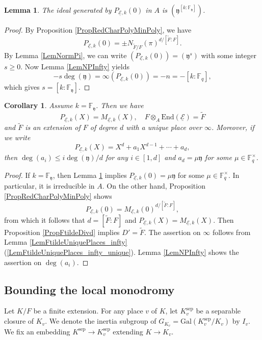 \documentclass[10pt]{amsart}
\theoremstyle{plain}
\newtheorem{lem}[thm]{Lemma}
\newtheorem{cor}[thm]{Corollary}
\theoremstyle{definition}
\newcommand{\End}{\mathrm{End}}
\newcommand{\Gal}{\mathrm{Gal}}
\newcommand{\sep}{\mathrm{sep}}
\newcommand{\ucE}{\underline{\mathcal{E}}}
\newcommand{\bF}{\mathbb{F}}
\newcommand{\fry}{\mathfrak{y}}
\begin{document}
\begin{lem}\label{LemConstTermRedCharPoly}
	The ideal generated by $P_{\ucE,k}(0)$ in $A$ is $(\fry^{[k:\bF_\fry]})$.
\end{lem}
\begin{proof}
	By Proposition \ref{PropRedCharPolyMinPoly}, we have
	\[
	P_{\ucE,k}(0)=\pm N_{\tilde{F}/F}(\pi)^{d/[\tilde{F}:F]}.
	\]
	By Lemma \ref{LemNormPi}, we can write $(P_{\ucE,k}(0))=(\fry^s)$ with some integer $s\geq 0$.
	Now Lemma \ref{LemNPInfty} yields
	\[
	-s\deg(\fry)=\infty(P_{\ucE,k}(0))=-n=-[k:\bF_q],
	\]
	which gives $s=[k:\bF_\fry]$.
\end{proof}



\begin{cor}\label{CorYTotRam}
	Assume $k=\bF_\fry$. Then we have
	\[
	P_{\ucE,k}(X)=M_{\ucE,k}(X),\quad F\otimes_A\End(\ucE)=\tilde{F}
	\]
	and $\tilde{F}$ is an extension of $F$ of degree $d$ with a unique place over $\infty$.
	Moreover, if we write
	\[
	P_{\ucE,k}(X)=X^d+a_1 X^{d-1}+\cdots+a_d,
	\]
	then $\deg(a_i)\leq i \deg(\fry)/d$ for any $i\in [1,d]$ and $a_d=\mu \fry$ for some $\mu\in \bF_q^\times$.
\end{cor}
\begin{proof}
	If $k=\bF_\fry$, then Lemma \ref{LemConstTermRedCharPoly} implies $P_{\ucE,k}(0)=\mu\fry$ for some $\mu\in \bF_q^\times$.
	In particular, it is irreducible in $A$.
	On the other hand, Proposition \ref{PropRedCharPolyMinPoly} shows 
	\[
	P_{\ucE,k}(0)=M_{\ucE,k}(0)^{d/[\tilde{F}:F]},
	\] 
	from which it follows that $d=[\tilde{F}:F]$ and $P_{\ucE,k}(X)=M_{\ucE,k}(X)$. 
	Then Proposition \ref{PropFtildeDivd} implies $D'=\tilde{F}$.
	The assertion on $\infty$ follows from Lemma \ref{LemFtildeUniquePlaces_infty} (\ref{LemFtildeUniquePlaces_infty_unique}).
	Lemma \ref{LemNPInfty} shows the assertion on $\deg(a_i)$.
\end{proof}

\subsection{Bounding the local monodromy}\label{SubsecMonodromy}

Let $K/F$ be a finite extension. For any place $v$ of $K$, let $K_v^\sep$ be a separable closure of $K_v$.
We denote the inertia subgroup of $G_{K_v}=\Gal(K_v^\sep/K_v)$ by $I_v$.
We fix an embedding $K^\sep\to K_v^\sep$ extending $K\to K_v$.
\end{document}
